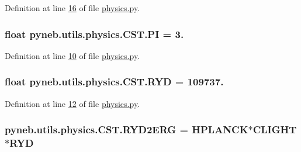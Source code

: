 Definition at line \hyperlink{physics_8py_source_l00016}{16} of file \hyperlink{physics_8py_source}{physics.\+py}.

\hypertarget{classpyneb_1_1utils_1_1physics_1_1_c_s_t_adeb7151ce462944ff7a0ff2803f873c3}{}
\subsubsection[{P\+I}]{\setlength{\rightskip}{0pt plus 5cm}float pyneb.\+utils.\+physics.\+C\+S\+T.\+P\+I = 3.\hspace{0.3cm}{\ttfamily [static]}}\label{classpyneb_1_1utils_1_1physics_1_1_c_s_t_adeb7151ce462944ff7a0ff2803f873c3}


Definition at line \hyperlink{physics_8py_source_l00010}{10} of file \hyperlink{physics_8py_source}{physics.\+py}.

\hypertarget{classpyneb_1_1utils_1_1physics_1_1_c_s_t_a468e4f9fac1fbd71b5ca458a84ae05cc}{}
\subsubsection[{R\+Y\+D}]{\setlength{\rightskip}{0pt plus 5cm}float pyneb.\+utils.\+physics.\+C\+S\+T.\+R\+Y\+D = 109737.\hspace{0.3cm}{\ttfamily [static]}}\label{classpyneb_1_1utils_1_1physics_1_1_c_s_t_a468e4f9fac1fbd71b5ca458a84ae05cc}


Definition at line \hyperlink{physics_8py_source_l00012}{12} of file \hyperlink{physics_8py_source}{physics.\+py}.

\hypertarget{classpyneb_1_1utils_1_1physics_1_1_c_s_t_a3da260eac736f7d74c20f76f79239425}{}
\subsubsection[{R\+Y\+D2\+E\+R\+G}]{\setlength{\rightskip}{0pt plus 5cm}pyneb.\+utils.\+physics.\+C\+S\+T.\+R\+Y\+D2\+E\+R\+G = {\bf H\+P\+L\+A\+N\+C\+K}$\ast${\bf C\+L\+I\+G\+H\+T}$\ast${\bf R\+Y\+D}\hspace{0.3cm}{\ttfamily [static]}}\label{classpyneb_1_1utils_1_1physics_1_1_c_s_t_a3da260eac736f7d74c20f76f79239425}


